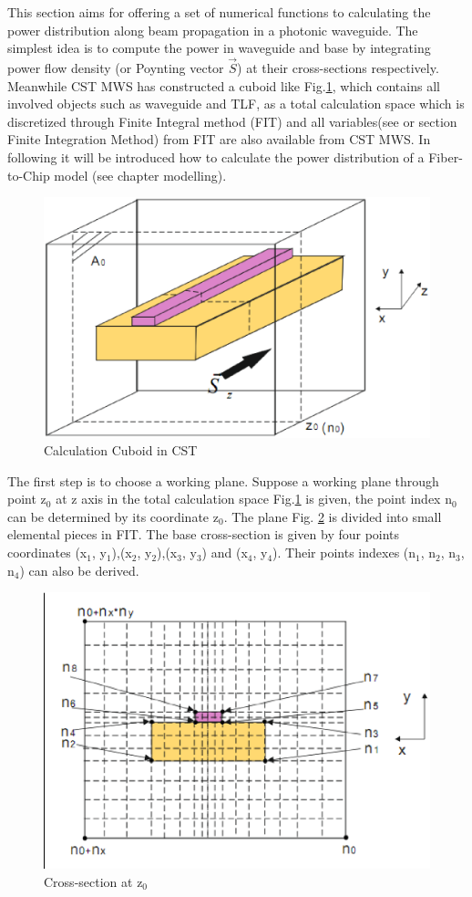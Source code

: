 
This section aims for offering a set of numerical functions to calculating the power distribution along beam propagation in a photonic waveguide. The simplest idea is to compute the power in waveguide and base by integrating power flow density (or Poynting vector $\vec{S}$) at their cross-sections respectively. Meanwhile CST MWS has constructed a cuboid like Fig.\quad\ref{Afig:app_power_distribution01}, which contains all involved objects such as waveguide and TLF, as a total calculation space which is discretized through Finite Integral method (FIT) and all variables(see \cite{script_FeldSim} or section Finite Integration Method) from FIT are also available from CST MWS. In following it will be introduced how to calculate the power distribution of a Fiber-to-Chip model (see chapter modelling). 
\begin{figure}[ht]
\centering
\includegraphics[width=0.7 \textwidth]{bilder/app_power_distribution01}
\caption{Calculation Cuboid in CST}
\label{Afig:app_power_distribution01}
\end{figure}
The first step is to choose a working plane. Suppose a working plane through point z$_{0}$ at z axis in the total calculation space Fig.\quad\ref{Afig:app_power_distribution01} is given, the point index n$_{0}$ can be determined by its coordinate z$_{0}$. The plane Fig. \quad\ref{Afig:app_power_distribution02}  is divided into small elemental pieces in FIT. The base cross-section is given by four points coordinates (x$_{1}$, y$_{1}$),(x$_{2}$, y$_{2}$),(x$_{3}$, y$_{3}$) and (x$_{4}$, y$_{4}$). Their points indexes (n$_{1}$, n$_{2}$, n$_{3}$, n$_{4}$) can also be derived.    
\begin{figure}[ht]
\centering
\includegraphics[width=0.7 \textwidth]{bilder/app_power_distribution02}
\caption{Cross-section at z$_{0}$}
\label{Afig:app_power_distribution02}
\end{figure}
